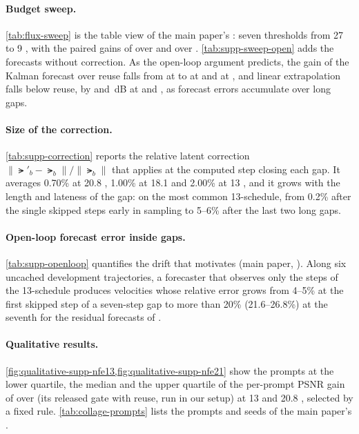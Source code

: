 

\paragraph{Budget sweep.}
\cref{tab:flux-sweep} is the table view of the main paper's : seven thresholds from 27 to 9 \nfe,
with the paired gains of \ours over \seacache and over \kalsea. \cref{tab:supp-sweep-open} adds the
forecasts without correction. As the open-loop argument predicts, the gain of the Kalman forecast over reuse falls from
\suppKalVsReuseMax{} at \suppKalVsReuseMaxNfe{} \nfe to \suppKalVsReuseNext{} at \suppLinBelowReuseNfeB{} \nfe and
\suppKalVsReuseMin{} at \suppKalVsReuseMinNfe{} \nfe, and linear extrapolation falls below reuse, by
\suppLinBelowReuseB{} and \suppLinBelowReuseA\,dB at \suppLinBelowReuseNfeB{} and \suppLinBelowReuseNfeA{} \nfe, as
forecast errors accumulate over long gaps.



\paragraph{Size of the correction.}
\cref{tab:supp-correction} reports the relative latent correction $\|\lat'_b-\lat_b\|/\|\lat_b\|$ that \pcgs applies at
the computed step closing each gap. It averages 0.70\% at 20.8 \nfe, 1.00\% at 18.1 \nfe and 2.00\% at 13 \nfe, and it
grows with the length and lateness of the gap: on the most common 13-\nfe schedule, from 0.2\% after the single skipped
steps early in sampling to 5--6\% after the last two long gaps.



\paragraph{Open-loop forecast error inside gaps.}
\cref{tab:supp-openloop} quantifies the drift that motivates \pcgs (main paper, ). Along six uncached
development trajectories, a forecaster that observes only the steps of the 13-\nfe schedule produces velocities whose
relative error grows from 4--5\% at the first skipped step of a seven-step gap to more than 20\% (21.6--26.8\%) at the
seventh for the residual forecasts of \kalsea.



\paragraph{Qualitative results.}
\label{supp:qualitative}
\cref{fig:qualitative-supp-nfe13,fig:qualitative-supp-nfe21} show the prompts at the lower quartile, the median and the
upper quartile of the per-prompt PSNR gain of \ours over \seacache (its released gate with reuse, run in our setup) at 13
and 20.8 \nfe, selected by a fixed rule. \cref{tab:collage-prompts} lists the prompts and seeds of the main paper's
.


